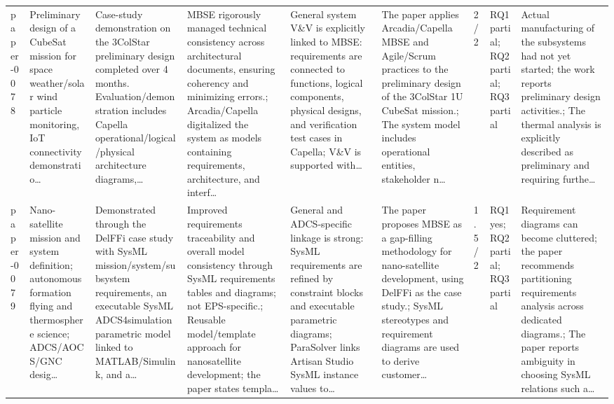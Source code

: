 \documentclass[10pt]{article}
\begin{document}
\begin{landscape}
\begin{longtable}{p{1.0cm}p{2.4cm}p{3.1cm}p{3.7cm}p{3.4cm}p{3.1cm}p{1.0cm}p{1.8cm}p{3.4cm}}
paper-0078 & Preliminary design of a CubeSat mission for space weather/solar wind particle monitoring, IoT connectivity demonstratio… & Case-study demonstration on the 3ColStar preliminary design completed over 4 months. Evaluation/demonstration includes Capella operational/logical/physical architecture diagrams,… & MBSE rigorously managed technical consistency across architectural documents, ensuring coherency and minimizing errors.; Arcadia/Capella digitalized the system as models containing requirements, architecture, and interf… & General system V\&V is explicitly linked to MBSE: requirements are connected to functions, logical components, physical designs, and verification test cases in Capella; V\&V is supported with… & The paper applies Arcadia/Capella MBSE and Agile/Scrum practices to the preliminary design of the 3ColStar 1U CubeSat mission.; The system model includes operational entities, stakeholder n… & 2/2 & RQ1 partial; RQ2 partial; RQ3 partial & Actual manufacturing of the subsystems had not yet started; the work reports preliminary design activities.; The thermal analysis is explicitly described as preliminary and requiring furthe… \\
paper-0079 & Nano-satellite mission and system definition; autonomous formation flying and thermosphere science; ADCS/AOCS/GNC desig… & Demonstrated through the DelFFi case study with SysML mission/system/subsystem requirements, an executable SysML ADCS4simulation parametric model linked to MATLAB/Simulink, and a… & Improved requirements traceability and overall model consistency through SysML requirements tables and diagrams; not EPS-specific.; Reusable model/template approach for nanosatellite development; the paper states templa… & General and ADCS-specific linkage is strong: SysML requirements are refined by constraint blocks and executable parametric diagrams; ParaSolver links Artisan Studio SysML instance values to… & The paper proposes MBSE as a gap-filling methodology for nano-satellite development, using DelFFi as the case study.; SysML stereotypes and requirement diagrams are used to derive customer… & 1.5/2 & RQ1 yes; RQ2 partial; RQ3 partial & Requirement diagrams can become cluttered; the paper recommends partitioning requirements analysis across dedicated diagrams.; The paper reports ambiguity in choosing SysML relations such a… \\

\end{longtable}
\end{landscape}
\end{document}
